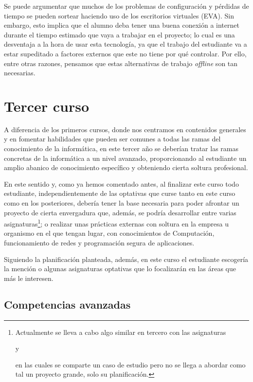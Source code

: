 Se puede argumentar que
muchos de los problemas de configuración y pérdidas de tiempo
se pueden sortear haciendo uso de los escritorios virtuales (EVA).
Sin embargo, esto implica que el alumno deba tener
una buena conexión a internet durante el tiempo estimado que
vaya a trabajar en el proyecto;
lo cual es una desventaja a la hora de usar esta tecnología,
ya que el trabajo del estudiante va a estar supeditado a
factores externos que este no tiene por qué controlar.
Por ello, entre otras razones,
pensamos que estas alternativas de trabajo \emph{offline} son tan necesarias.

\section{Tercer curso}

A diferencia de los primeros cursos,
donde nos centramos en contenidos generales y en fomentar habilidades que
pueden ser comunes a todas las ramas del conocimiento de la informática,
en este tercer año
se deberían tratar las ramas concretas de la informática a un nivel avanzado,
proporcionando al estudiante un amplio abanico de conocimiento específico y
obteniendo cierta soltura profesional.

En este sentido y, como ya hemos comentado antes,
al finalizar este curso todo estudiante,
independientemente de las optativas que curse
tanto en este curso como en los posteriores,
debería tener la base necesaria para
poder afrontar un proyecto de cierta envergadura que, además,
se podría desarrollar entre varias asignaturas\footnote{
    Actualmente se lleva a cabo algo similar en tercero con las asignaturas
    \subject{Procesos de Desarrollo Software} y
    \subject{Gestión de Procesos de Desarrollo Software}
    en las cuales se comparte un caso de estudio pero
    no se llega a abordar como tal un proyecto grande, solo su planificación.
}; o realizar unas prácticas externas con soltura en la empresa u organismo
en el que tengan lugar,
con conocimientos de Computación,
funcionamiento de redes y
programación segura de aplicaciones.

Siguiendo la planificación planteada, además,
en este curso el estudiante escogería la mención o
algunas asignaturas optativas
que lo focalizarán en las áreas que más le interesen.

\subsection{Competencias avanzadas}

